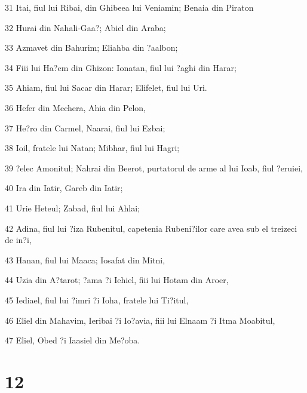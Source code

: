 \par 31 Itai, fiul lui Ribai, din Ghibeea lui Veniamin; Benaia din Piraton
\par 32 Hurai din Nahali-Gaa?; Abiel din Araba;
\par 33 Azmavet din Bahurim; Eliahba din ?aalbon;
\par 34 Fiii lui Ha?em din Ghizon: Ionatan, fiul lui ?aghi din Harar;
\par 35 Ahiam, fiul lui Sacar din Harar; Elifelet, fiul lui Uri.
\par 36 Hefer din Mechera, Ahia din Pelon,
\par 37 He?ro din Carmel, Naarai, fiul lui Ezbai;
\par 38 Ioil, fratele lui Natan; Mibhar, fiul lui Hagri;
\par 39 ?elec Amonitul; Nahrai din Beerot, purtatorul de arme al lui Ioab, fiul ?eruiei,
\par 40 Ira din Iatir, Gareb din Iatir;
\par 41 Urie Heteul; Zabad, fiul lui Ahlai;
\par 42 Adina, fiul lui ?iza Rubenitul, capetenia Rubeni?ilor care avea sub el treizeci de in?i,
\par 43 Hanan, fiul lui Maaca; Iosafat din Mitni,
\par 44 Uzia din A?tarot; ?ama ?i Iehiel, fiii lui Hotam din Aroer,
\par 45 Iediael, fiul lui ?imri ?i Ioha, fratele lui Ti?itul,
\par 46 Eliel din Mahavim, Ieribai ?i Io?avia, fiii lui Elnaam ?i Itma Moabitul,
\par 47 Eliel, Obed ?i Iaasiel din Me?oba.

\chapter{12}

